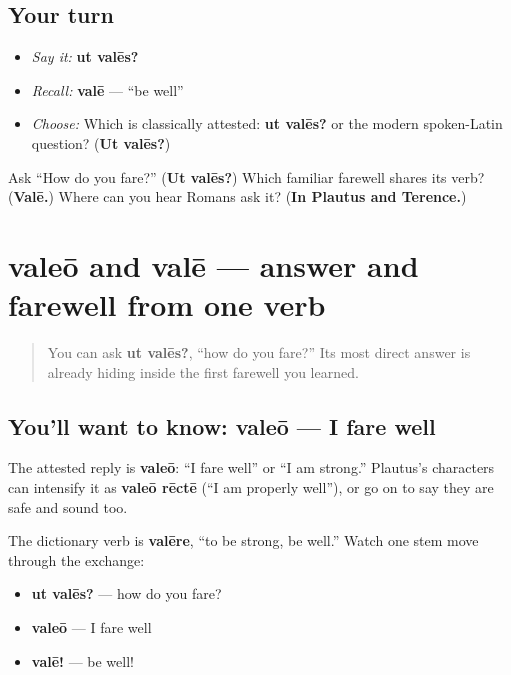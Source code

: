 \subsection*{Your turn}
\begin{itemize}
\raggedright
  \item \emph{Say it:} \textbf{ut valēs?}
  \item \emph{Recall:} \textbf{valē} — “be well”
  \item \emph{Choose:} Which is classically attested: \textbf{ut valēs?} or the modern spoken-Latin question? (\textbf{Ut valēs?})
\end{itemize}

\begin{tcolorbox}[breakable,colback=teal!4,colframe=teal!35!black,title={Before you move on}]
Ask “How do you fare?” (\textbf{Ut valēs?}) Which familiar farewell shares its verb? (\textbf{Valē.}) Where can you hear Romans ask it? (\textbf{In Plautus and Terence.})
\end{tcolorbox}
\section[valeō, valē]{valeō and valē — answer and farewell from one verb}

\label{lesson:LA-C19-valeo-family}



\begin{quote}
You can ask \textbf{ut valēs?}, \textquotedblleft{}how do you fare?\textquotedblright{} Its most direct answer is already hiding inside the first farewell you learned.
\end{quote}

\subsection*{You'll want to know: valeō — I fare well}
The attested reply is \textbf{valeō}: \textquotedblleft{}I fare well\textquotedblright{} or \textquotedblleft{}I am strong.\textquotedblright{} Plautus's characters can intensify it as \textbf{valeō rēctē} (\textquotedblleft{}I am properly well\textquotedblright{}), or go on to say they are safe and sound too.

The dictionary verb is \textbf{valēre}, \textquotedblleft{}to be strong, be well.\textquotedblright{} Watch one stem move through the exchange:

\begin{itemize}
\raggedright
  \item \textbf{ut valēs?} — how do you fare?
  \item \textbf{valeō} — I fare well
  \item \textbf{valē!} — be well!
\end{itemize}

